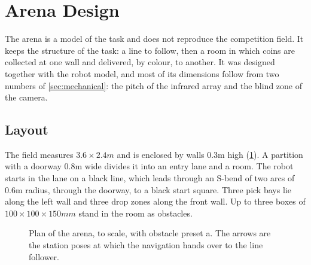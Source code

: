 \section{Arena Design}
\label{sec:arena}

The arena is a model of the task and does not reproduce the competition field. It keeps the structure of the task: a line to follow, then a
room in which coins are collected at one wall and delivered, by colour, to another. It was
designed together with the robot model, and most of its dimensions follow from two numbers
of \cref{sec:mechanical}: the pitch of the infrared array and the blind zone of the camera.

\subsection{Layout}
The field measures $3.6\times2.4\unit{m}$ and is enclosed by walls 0.3\unit{m} high
(\cref{fig:arena}). A partition with a doorway 0.8\unit{m} wide divides it into an entry
lane and a room. The robot starts in the lane on a black line, which leads through an S-bend
of two arcs of 0.6\unit{m} radius, through the doorway, to a black start square. Three pick
bays lie along the left wall and three drop zones along the front wall. Up to three boxes of
$100\times100\times150\unit{mm}$ stand in the room as obstacles.

\begin{figure}[htbp]
  \centering
  \caption{Plan of the arena, to scale, with obstacle preset a. The arrows are the station
  poses at which the navigation hands over to the line follower.}
  \label{fig:arena}
\end{figure}

